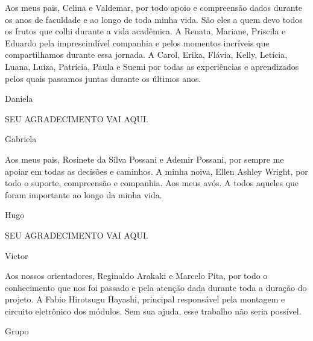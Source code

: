 Aos meus pais, Celina e Valdemar, por todo apoio e compreensão dados durante os anos de faculdade e ao longo de toda minha vida. São eles a quem devo todos os frutos que colhi durante a vida acadêmica.
A Renata, Mariane, Priscila e Eduardo pela imprescindível companhia e pelos momentos incríveis que compartilhamos durante essa jornada.
A Carol, Erika, Flávia, Kelly, Letícia, Luana, Luiza, Patrícia, Paula e Suemi por todas as experiências e aprendizados pelos quais passamos juntas durante os últimos anos.
\begin{flushright}
    Daniela
\end{flushright}

SEU AGRADECIMENTO VAI AQUI.
\begin{flushright}
    Gabriela
\end{flushright}

Aos meus pais, Rosinete da Silva Possani e Ademir Possani, por sempre me apoiar em todas as decisões e caminhos. A minha noiva, Ellen Ashley Wright, por todo o suporte, compreensão e companhia. Aos meus avós. A todos aqueles que foram importante ao longo da minha vida.
\begin{flushright}
    Hugo
\end{flushright}

SEU AGRADECIMENTO VAI AQUI.
\begin{flushright}
    Victor
\end{flushright}

Aos nossos orientadores, Reginaldo Arakaki e Marcelo Pita, por todo o conhecimento que nos foi passado e pela atenção dada durante toda a duração do projeto.
A Fabio Hirotsugu Hayashi, principal responsável pela montagem e circuito eletrônico dos módulos. Sem sua ajuda, esse trabalho não seria possível.
\begin{flushright}
    Grupo
\end{flushright}
